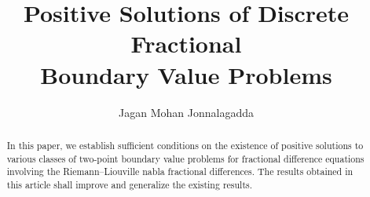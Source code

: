 \documentclass[12pt]{llncs}
\begin{document}
\fi

\title{Positive Solutions of Discrete Fractional\\ Boundary Value Problems}

\author{Jagan Mohan Jonnalagadda}

\maketitle

\begin{abstract}
In this paper, we establish sufficient conditions on the existence of positive solutions to various classes of two-point boundary value problems for fractional difference equations involving the Riemann--Liouville nabla fractional differences. The results obtained in this article shall improve and generalize the existing results.

\end{abstract}

\end{document}
